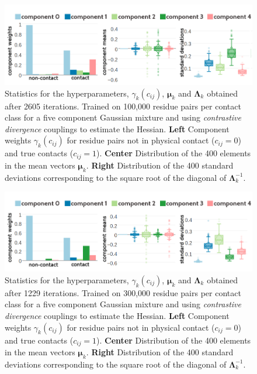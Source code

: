 \documentclass[11pt,a4paper,twoside]{book}
\newcommand{\eq}{\!=\!}
\newcommand{\Lk}{\mathbf{\Lambda}_k}
\newcommand{\muk}{\mathbf{\mu}_k}
\newcommand{\cij}{c_{ij}}
\theoremstyle{definition}
\theoremstyle{definition}
\theoremstyle{remark}
\begin{document}
\begin{figure}
\includegraphics[width=1\linewidth]{img/bayesian_model/cd/5/stats-cd-5comp-100k_contactthr25} \caption{Statistics for the hyperparameters,
\(\gamma_k(\cij)\), \(\muk\) and \(\Lk\) obtained after 2605 iterations.
Trained on 100,000 residue pairs per contact class for a five component
Gaussian mixture and using \emph{contrastive divergence} couplings to
estimate the Hessian. \textbf{Left} Component weights \(\gamma_k(\cij)\)
for residue pairs not in physical contact (\(\cij \eq 0\)) and true
contacts (\(\cij \eq 1\)). \textbf{Center} Distribution of the 400
elements in the mean vectors \(\muk\). \textbf{Right} Distribution of
the 400 standard deviations corresponding to the square root of the
diagonal of \(\Lk^{-1}\).}\label{fig:stats-cd-5comp-100k}
\end{figure}












\begin{figure}
\includegraphics[width=1\linewidth]{img/bayesian_model/cd/5/stats-cd-5comp-300k_contactthr25} \caption{Statistics for the hyperparameters,
\(\gamma_k(\cij)\), \(\muk\) and \(\Lk\) obtained after 1229 iterations.
Trained on 300,000 residue pairs per contact class for a five component
Gaussian mixture and using \emph{contrastive divergence} couplings to
estimate the Hessian. \textbf{Left} Component weights \(\gamma_k(\cij)\)
for residue pairs not in physical contact (\(\cij \eq 0\)) and true
contacts (\(\cij \eq 1\)). \textbf{Center} Distribution of the 400
elements in the mean vectors \(\muk\). \textbf{Right} Distribution of
the 400 standard deviations corresponding to the square root of the
diagonal of \(\Lk^{-1}\).}\label{fig:stats-cd-5comp-300k}
\end{figure}
\end{document}

